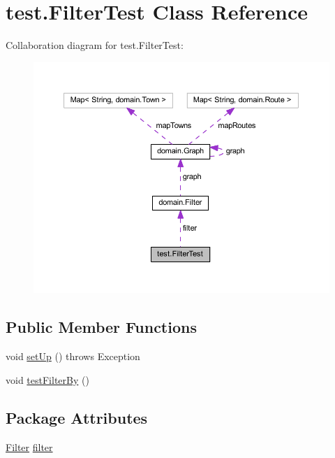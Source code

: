 \hypertarget{classtest_1_1_filter_test}{}\section{test.\+Filter\+Test Class Reference}
\label{classtest_1_1_filter_test}


Collaboration diagram for test.\+Filter\+Test\+:\nopagebreak
\begin{figure}[H]
\begin{center}
\leavevmode
\includegraphics[width=350pt]{classtest_1_1_filter_test__coll__graph}
\end{center}
\end{figure}
\subsection*{Public Member Functions}
\begin{DoxyCompactItemize}
\item 
void \hyperlink{classtest_1_1_filter_test_af76a634a6d91aad982f591ef07c21969}{set\+Up} ()  throws Exception 
\item 
void \hyperlink{classtest_1_1_filter_test_abd2f49938ef9663ecee1953d09bae933}{test\+Filter\+By} ()
\end{DoxyCompactItemize}
\subsection*{Package Attributes}
\begin{DoxyCompactItemize}
\item 
\hyperlink{classdomain_1_1_filter}{Filter} \hyperlink{classtest_1_1_filter_test_ac79abdc8770b75af63e5b8cc190c42c6}{filter}
\end{DoxyCompactItemize}


